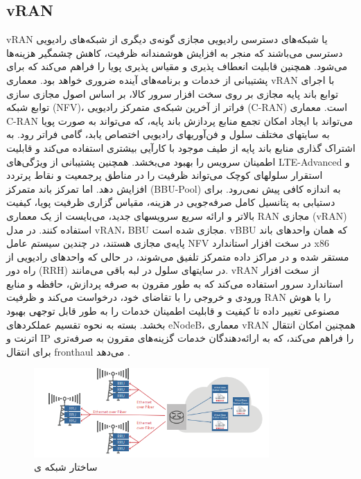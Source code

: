 \subsection{vRAN}
vRAN 
یا شبکه‌های دسترسی رادیویی مجازی
گونه‌ی دیگری از شبکه‌های رادیویی دسترسی می‌باشند که منجر به افزایش هوشمندانه ظرفیت، کاهش چشمگیر هزینه‌ها می‌شود. همچنین قابلیت انعطاف پذیری و مقیاس پذیری پویا را فراهم می‌کند که برای پشتیبانی از خدمات و برنامه‌های آینده ضروری خواهد بود.
معماری vRAN با اجرای توابع باند پایه مجازی بر روی سخت افزار سرور کالا، بر اساس اصول مجازی سازی توابع شبکه (NFV)، فراتر از آخرین شبکه‌ی  متمرکز رادیویی (C-RAN) است.
معماری C-RAN می‌تواند با ایجاد امکان تجمع منابع پردازش باند پایه، که می‌تواند به صورت پویا به سایتهای مختلف سلول و فن‌آوریهای رادیویی اختصاص یابد، گامی فراتر رود.
به اشتراک گذاری منابع باند پایه از طیف موجود با کارآیی بیشتری استفاده می‌کند و قابلیت اطمینان سرویس را بهبود می‌بخشد.
همچنین پشتیبانی از ویژگی‌های LTE-Advanced و استقرار سلولهای کوچک  می‌تواند ظرفیت را در مناطق پرجمعیت و نقاط پرتردد افزایش دهد.
اما تمرکز باند متمرکز (BBU-Pool) به اندازه کافی پیش نمی‌رود.
برای دستیابی به پتانسیل کامل صرفه‌جویی در هزینه، مقیاس گزاری ظرفیت پویا، کیفیت بالاتر و ارائه سریع سرویسهای جدید، می‌بایست از یک معماری RAN مجازی (vRAN) استفاده کنند. در مدل vRAN،
BBU 
مجازی شده است.
vBBU
که همان واحدهای باند پایه‌ی مجازی هستند، در چندین سیستم عامل NFV در سخت افزار استاندارد x86 مستقر شده و در مراکز داده متمرکز تلفیق می‌شوند، در حالی که واحدهای رادیویی از راه دور (RRH) در سایتهای سلول در لبه باقی می‌مانند.
vRAN 
از سخت افزار استاندارد سرور استفاده می‌کند که به طور مقرون به صرفه پردازش، حافظه و منابع ورودی و خروجی را با تقاضای خود، درخواست می‌کند و ظرفیت RAN را با هوش مصنوعی تغییر داده تا کیفیت و قابلیت اطمینان خدمات را به طور قابل توجهی بهبود بخشد.
بسته به نحوه تقسیم عملکردهای eNodeB، معماری vRAN همچنین امکان انتقال اترنت و IP را فراهم می‌کند، که به ارائه‌دهندگان خدمات گزینه‌های مقرون به صرفه‌تری برای انتقال fronthaul می‌دهد \cite{vran}.
\begin{figure}%
	\centering
	\includegraphics[width=0.8\textwidth]{./fig/vran}
	\caption{ساختار شبکه ی  \cite{vran}}
	\label{fig:vran}
\end{figure}


